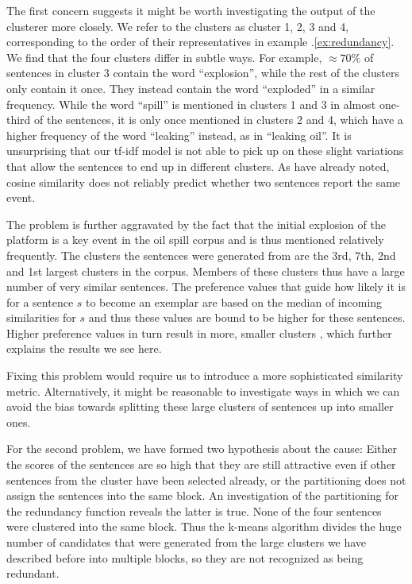\documentclass[a4paper,BCOR=10mm]{report}
\numberwithin{lemma}{chapter}
\numberwithin{definition}{chapter}
\begin{document}
The first concern suggests it might be worth investigating the output of the clusterer more closely.
We refer to the clusters as cluster 1, 2, 3 and 4, corresponding to the order of their representatives in example \thechapter.\ref{ex:redundancy}.
We find that the four clusters differ in subtle ways.
For example, $\approx 70\%$ of sentences in cluster 3 contain the word ``explosion'', while the rest of the clusters only contain it once. They instead contain the word ``exploded'' in a similar frequency.
While the word ``spill'' is mentioned in clusters 1 and 3 in almost one-third of the sentences, it is only once mentioned in clusters 2 and 4, which have a higher frequency of the word ``leaking'' instead, as in ``leaking oil''.
It is unsurprising that our tf-idf model is not able to pick up on these slight variations that allow the sentences to end up in different clusters. As \citet{chieu} have already noted, cosine similarity does not reliably predict whether two sentences report the same event.

The problem is further aggravated by the fact that the initial explosion of the platform is a key event in the oil spill corpus and is thus mentioned relatively frequently. The clusters the sentences were generated from are the 3rd, 7th, 2nd and 1st largest clusters in the corpus. Members of these clusters thus have a large number of very similar sentences. The preference values that guide how likely it is for a sentence $s$ to become an exemplar are based on the median of incoming similarities for $s$ and thus these values are bound to be higher for these sentences.
Higher preference values in turn result in more, smaller clusters \citep{ap}, which further explains the results we see here.

Fixing this problem would require us to introduce a more sophisticated similarity metric. Alternatively, it might be reasonable to investigate ways in which we can avoid the bias towards splitting these large clusters of sentences up into smaller ones.

For the second problem, we have formed two hypothesis about the cause: Either the scores of the sentences are so high that they are still attractive even if other sentences from the cluster have been selected already, or the partitioning does not assign the sentences into the same block.
An investigation of the partitioning for the redundancy function reveals the latter is true. None of the four sentences were clustered into the same block. Thus the k-means algorithm divides the huge number of candidates that were generated from the large clusters we have described before into multiple blocks, so they are not recognized as being redundant.
\end{document}
